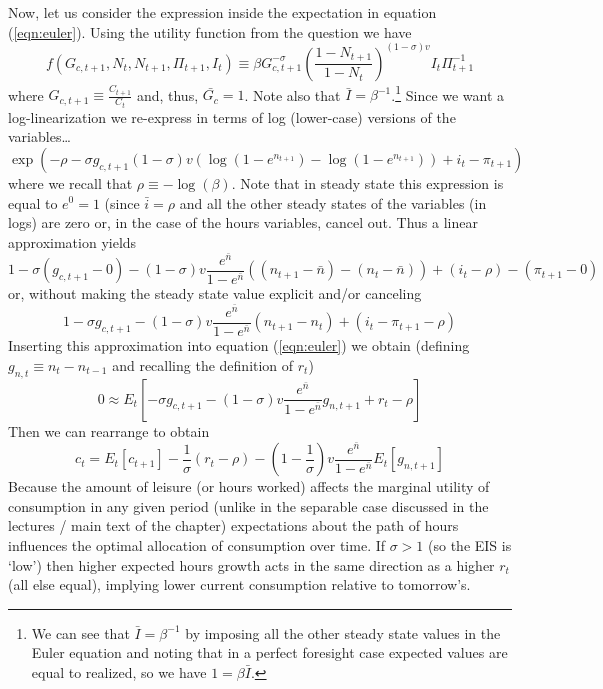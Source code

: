 \documentclass[authoryear,11pt]{elsarticle}
\begin{document}
Now, let us consider the expression inside the expectation in equation (\ref{eqn:euler}). Using the utility function from the question we have
\[
f(G_{c,t+1},N_{t},N_{t+1},\Pi_{t+1},I_{t}) \equiv \beta G_{c,t+1}^{-\sigma} \left( \frac{1-N_{t+1}}{1-N_{t}} \right)^{(1-\sigma)v} I_{t} \Pi_{t+1}^{-1} 
\]
where $G_{c,t+1}\equiv \frac{C_{t+1}}{C_{t}}$ and, thus, $\bar{G_{c}}=1$. Note also that $\bar{I}=\beta^{-1}$.\footnote{We can see that $\bar{I}=\beta^{-1}$ by imposing all the other steady state values in the Euler equation and noting that in a perfect foresight case expected values are equal to realized, so we have $1=\beta \bar{I}$.} Since we want a log-linearization we re-express in terms of log (lower-case) versions of the variables\ldots
\[
\exp{\left( -\rho -\sigma g_{c,t+1} (1-\sigma) v \left( \log{(1-e^{n_{t+1}})} - \log{(1-e^{n_{t+1}})} \right) + i_{t} - \pi_{t+1} \right)}
\]
where we recall that $\rho \equiv - \log{(\beta)}$. Note that in steady state this expression is equal to $e^{0}=1$ (since $\bar{i}=\rho$ and all the other steady states of the variables (in logs) are zero or, in the case of the hours variables, cancel out. Thus a linear approximation yields
\[
1 - \sigma (g_{c,t+1} - 0) - (1-\sigma)v \frac{e^{\bar{n}}}{1-e^{\bar{n}}}((n_{t+1}-\bar{n}) - (n_{t}-\bar{n}) ) + (i_{t}-\rho) - (\pi_{t+1}-0)
\]
or, without making the steady state value explicit and/or canceling
\[
1 - \sigma g_{c,t+1} - (1-\sigma)v \frac{e^{\bar{n}}}{1-e^{\bar{n}}}(n_{t+1} - n_{t} ) + (i_{t} - \pi_{t+1} -\rho)
\]
Inserting this approximation into equation (\ref{eqn:euler}) we obtain (defining $g_{n,t} \equiv n_{t}-n_{t-1}$ and recalling the definition of $r_{t}$)
\[
0 \approx E_{t} \left[ - \sigma g_{c,t+1} - (1-\sigma)v \frac{e^{\bar{n}}}{1-e^{\bar{n}}}g_{n,t+1} +r_{t} -\rho \right]
\]
Then we can rearrange to obtain
\[
c_{t} = E_{t} \left[ c_{t+1} \right] - \frac{1}{\sigma}(r_{t}-\rho) - \left( 1 - \frac{1}{\sigma}  \right) v \frac{e^{\bar{n}}}{1-e^{\bar{n}}} E_{t}[ g_{n,t+1} ]
\]
Because the amount of leisure (or hours worked) affects the marginal utility of consumption in any given period (unlike in the separable case discussed in the lectures / main text of the chapter) expectations about the path of hours influences the optimal allocation of consumption over time. If $\sigma>1$ (so the EIS is `low') then higher expected hours growth acts in the same direction as a higher $r_{t}$ (all else equal), implying lower current consumption relative to tomorrow's.
\end{document}
